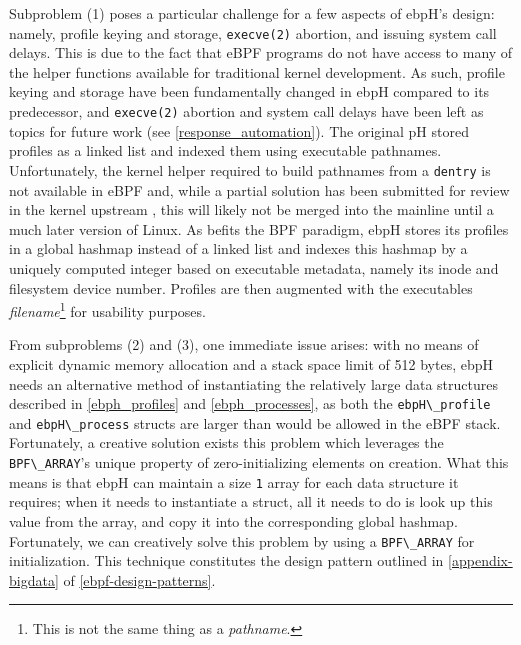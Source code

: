 \documentclass[
  12pt]{findlay}
\newcommand{\passthrough}[1]{#1}
\begin{document}
Subproblem (1) poses a particular challenge for a few aspects of ebpH's
design: namely, profile keying and storage,
\passthrough{\lstinline!execve(2)!} abortion, and issuing system call
delays. This is due to the fact that eBPF programs do not have access to
many of the helper functions available for traditional kernel
development. As such, profile keying and storage have been fundamentally
changed in ebpH compared to its predecessor, and
\passthrough{\lstinline!execve(2)!} abortion and system call delays have
been left as topics for future work (see \autoref{response_automation}).
The original pH \autocite{soma02} stored profiles as a linked list and
indexed them using executable pathnames. Unfortunately, the kernel
helper required to build pathnames from a
\passthrough{\lstinline!dentry!} is not available in eBPF and, while a
partial solution has been submitted for review in the kernel upstream
\autocite{zhang19}, this will likely not be merged into the mainline
until a much later version of Linux. As befits the BPF paradigm, ebpH
stores its profiles in a global hashmap instead of a linked list and
indexes this hashmap by a uniquely computed integer based on executable
metadata, namely its inode and filesystem device number. Profiles are
then augmented with the executables \emph{filename}\footnote{This is
not the same thing as a \emph{pathname}.} for usability purposes.

From subproblems (2) and (3), one immediate issue arises: with no means
of explicit dynamic memory allocation and a stack space limit of 512
bytes, ebpH needs an alternative method of instantiating the relatively
large data structures described in \autoref{ebph_profiles} and
\autoref{ebph_processes}, as both the
\passthrough{\lstinline!ebpH\_profile!} and
\passthrough{\lstinline!ebpH\_process!} structs are larger than would be
allowed in the eBPF stack. Fortunately, a creative solution exists this
problem which leverages the \passthrough{\lstinline!BPF\_ARRAY!}'s
unique property of zero-initializing elements on creation. What this
means is that ebpH can maintain a size \passthrough{\lstinline!1!} array
for each data structure it requires; when it needs to instantiate a
struct, all it needs to do is look up this value from the array, and
copy it into the corresponding global hashmap. Fortunately, we can
creatively solve this problem by using a
\passthrough{\lstinline!BPF\_ARRAY!} for initialization. This technique
constitutes the design pattern outlined in \autoref{appendix-bigdata} of
\autoref{ebpf-design-patterns}.
\end{document}
